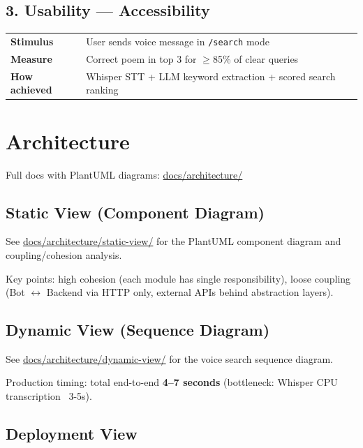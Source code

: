 \documentclass[11pt, a4paper]{article}
\begin{document}
\subsection*{3. Usability --- Accessibility}

\begin{tabularx}{\textwidth}{lX}
\toprule
\textbf{Stimulus} & User sends voice message in \texttt{/search} mode \\
\textbf{Measure} & Correct poem in top 3 for $\geq$85\% of clear queries \\
\textbf{How achieved} & Whisper STT + LLM keyword extraction + scored search ranking \\
\bottomrule
\end{tabularx}

\section{Architecture}

Full docs with PlantUML diagrams: \href{https://github.com/d13-l1t3/PoetryForYou/tree/main/docs/architecture}{docs/architecture/}

\subsection*{Static View (Component Diagram)}

See \href{https://github.com/d13-l1t3/PoetryForYou/tree/main/docs/architecture/static-view}{docs/architecture/static-view/} for the PlantUML component diagram and coupling/cohesion analysis.

Key points: high cohesion (each module has single responsibility), loose coupling (Bot $\leftrightarrow$ Backend via HTTP only, external APIs behind abstraction layers).

\subsection*{Dynamic View (Sequence Diagram)}

See \href{https://github.com/d13-l1t3/PoetryForYou/tree/main/docs/architecture/dynamic-view}{docs/architecture/dynamic-view/} for the voice search sequence diagram.

Production timing: total end-to-end \textbf{4--7 seconds} (bottleneck: Whisper CPU transcription ~3-5s).

\subsection*{Deployment View}
\end{document}
